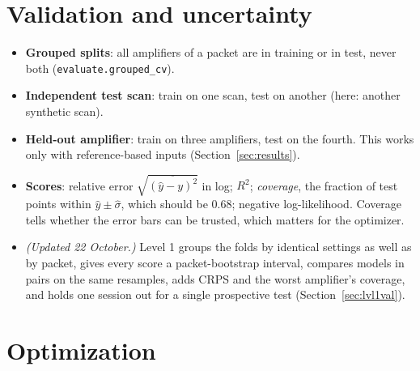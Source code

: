\documentclass[10pt]{article}
\newcommand{\code}[1]{\texttt{#1}}
\begin{document}
\section{Validation and uncertainty}

\begin{itemize}
\item \textbf{Grouped splits}: all amplifiers of a packet are in training or in test, never both (\code{evaluate.grouped\_cv}).
\item \textbf{Independent test scan}: train on one scan, test on another (here: another synthetic scan).
\item \textbf{Held-out amplifier}: train on three amplifiers, test on the fourth. This works only with reference-based inputs
  (Section~\ref{sec:results}).
\item \textbf{Scores}: relative error $\sqrt{\overline{(\hat y - y)^2}}$ in log; $R^2$; \emph{coverage}, the fraction of test points
  within $\hat y \pm \hat\sigma$, which should be 0.68; negative log-likelihood. Coverage tells whether the error bars can be trusted,
  which matters for the optimizer.
\item \textit{(Updated 22 October.)} Level 1 groups the folds by identical settings as well as by packet, gives every score a
  packet-bootstrap interval, compares models in pairs on the same resamples, adds CRPS and the worst amplifier's coverage, and holds
  one session out for a single prospective test (Section~\ref{sec:lvl1val}).
\end{itemize}

\section{Optimization}
\label{sec:bo}
\end{document}
